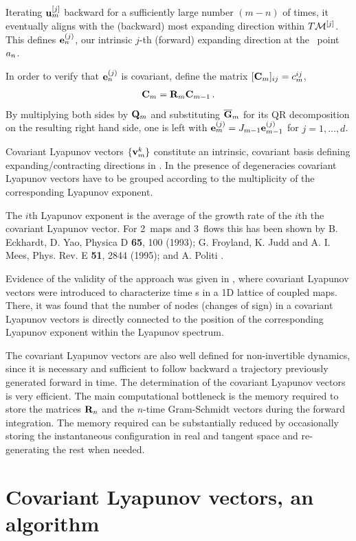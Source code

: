 Iterating ${\bf u}_m^{[j]}$ backward for a sufficiently large
number $(m-n)$ of times, it eventually aligns with the
(backward) most expanding direction within $T{\cal M}^{[j]}$. This
defines  ${\bf e}_n^{(j)}$, our intrinsic $j$-th (forward)
expanding direction at the \statesp\ point $a_n$.

In order to verify that ${\bf e}_n^{(j)}$ is covariant, define
the matrix $[{\bf C}_m]_{ij} = c_m^{ij}$,
\[
{\bf C}_m = {\bf R}_m {\bf C}_{m-1}
\,.
\]
By multiplying both sides by ${\bf Q}_m$ and substituting
$\overline {\bf G}_m$ for its QR decomposition on the resulting
right hand side, one is left with ${\bf
e}_{m}^{(j)}=J_{m-1} {\bf e}_{m-1}^{(j)}$ for $j=1,\ldots,
d$.

Covariant Lyapunov vectors $\{{\bf v}_{m}^k\}$ constitute an
intrinsic, covariant basis defining expanding/contracting
directions in \statesp.
In the presence of degeneracies covariant Lyapunov vectors
have to be grouped according to the multiplicity of the
corresponding Lyapunov exponent.

The $i$th Lyapunov exponent is the average of the growth rate
of the $i$th the covariant Lyapunov vector. For 2\dmn\ maps and
3\dmn\ flows this has been shown by B. Eckhardt, D. Yao,
Physica D {\bf 65}, 100 (1993); G. Froyland, K. Judd and A. I.
Mees, Phys. Rev. E {\bf 51}, 2844 (1995); and A. Politi
\etal{}.

Evidence of the validity of the approach was given in
, where covariant Lyapunov vectors were
introduced to characterize time {\po s} in a 1D
lattice of coupled maps. There, it was found that the number
of nodes (changes of sign) in a covariant Lyapunov vectors is
directly connected to the position of the corresponding
Lyapunov exponent within the Lyapunov spectrum.


The covariant Lyapunov vectors are also well defined for
non-invertible dynamics, since it is necessary and sufficient
to follow backward a trajectory previously generated forward in
time. The determination of the covariant Lyapunov vectors is
very efficient. The main computational bottleneck is the memory
required to store the matrices ${\bf R}_n$ and the $n$-time
Gram-Schmidt vectors during the forward integration. The memory
required can be substantially reduced by occasionally storing
the instantaneous configuration in real and tangent space and
re-generating the rest when needed.


\section{Covariant Lyapunov vectors, an algorithm}


